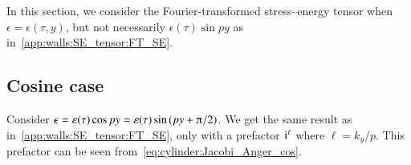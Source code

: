











In this section, we consider the Fourier-transformed stress--energy tensor when $\epsilon = \epsilon(\tau,y)$, but not necessarily $\epsilon(\tau)\sin{py}$ as in~\cref{app:walls:SE_tensor:FT_SE}.


\subsection{Cosine case}\label{app:walls:SE_tensor_alt:cos}
    Consider $\epsilon=\varepsilon(\tau)\cos{py} = \varepsilon(\tau)\sin{(py  + \ppi/2 )}$. We get the same result as in~\cref{app:walls:SE_tensor:FT_SE}, only with a prefactor $\mathrm{i}^{\ell}$ where $\ell = k_y/p$. This prefactor can be seen from~\cref{eq:cylinder:Jacobi_Anger_cos}.




